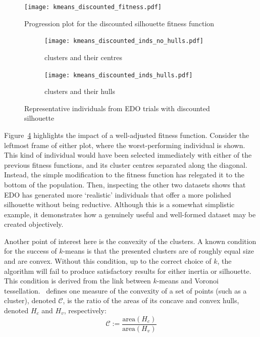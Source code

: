 \begin{figure}
    \centering
    \texttt{[image: kmeans\_discounted\_fitness.pdf]}%
    \caption{%
        Progression plot for the discounted silhouette fitness function
    }\label{fig:discounted_progression}
\end{figure}

\begin{figure}
    \centering
    \begin{subfigure}{\linewidth}
        \texttt{[image: kmeans\_discounted\_inds\_no\_hulls.pdf]}
        \caption{%
            clusters and their centres%
        }\label{fig:kmeans_discounted_inds_no_hulls}
    \end{subfigure}

    \vspace{1em}
    \begin{subfigure}{\linewidth}
        \texttt{[image: kmeans\_discounted\_inds\_hulls.pdf]}
        \caption{%
            clusters and their hulls%
        }\label{fig:kmeans_discounted_inds_hulls}
    \end{subfigure}
    \caption{%
        Representative individuals from EDO trials with discounted silhouette
    }\label{fig:kmeans_discounted_inds}
\end{figure}

Figure~\ref{fig:kmeans_discounted_inds} highlights the impact of a well-adjusted
fitness function. Consider the leftmost frame of either plot, where the
worst-performing individual is shown. This kind of individual would have been
selected immediately with either of the previous fitness functions, and its
cluster centres separated along the diagonal. Instead, the simple modification
to the fitness function has relegated it to the bottom of the population. Then,
inspecting the other two datasets shows that EDO has generated more `realistic'
individuals that offer a more polished silhouette without being reductive.
Although this is a somewhat simplistic example, it demonstrates how a genuinely
useful and well-formed dataset may be created objectively.

Another point of interest here is the convexity of the clusters. A known
condition for the success of \(k\)-means is that the presented clusters are of
roughly equal size and are convex. Without this condition, up to the correct
choice of \(k\), the algorithm will fail to produce satisfactory results for
either inertia or silhouette. This condition is derived from the link between
\(k\)-means and Voronoi tessellation.~\cite{Sonka1993} defines one measure of
the convexity of a set of points (such as a cluster), denoted \(\mathcal C\), is
the ratio of the areas of its concave and convex hulls, denoted \(H_c\) and
\(H_v\), respectively:
\begin{equation}
    \mathcal C :=
    \frac{\text{area}\left(H_c\right)}{\text{area}\left(H_v\right)}
\end{equation}

